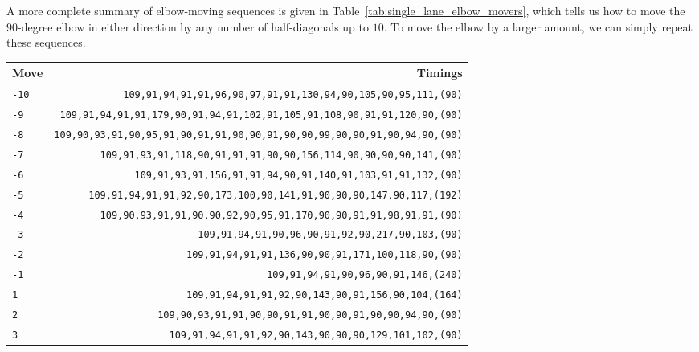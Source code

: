 A more complete summary of elbow-moving sequences is given in Table~\ref{tab:single_lane_elbow_movers}, which tells us how to move the $90$-degree elbow in either direction by any number of half-diagonals up to $10$. To move the elbow by a larger amount, we can simply repeat these sequences.

\begin{table}[!htb]
	\centering
	\begin{tabular}{@{\hskip 0.31cm}L@{\hskip 0.27cm}R@{\hskip 0.34cm}}\toprule
		Move & Timings \\\midrule
		\texttt{-10} & \footnotesize\texttt{109,91,94,91,91,96,90,97,91,91,130,94,90,105,90,95,111,{\color{gray}(90)}}\\
		 \texttt{-9} & \footnotesize\texttt{109,91,94,91,91,179,90,91,94,91,102,91,105,91,108,90,91,91,120,90,{\color{gray}(90)}}\\
		\texttt{-8} & \footnotesize\texttt{109,90,93,91,90,95,91,90,91,91,90,90,91,90,90,99,90,90,91,90,94,90,{\color{gray}(90)}}\\
		 \texttt{-7} & \footnotesize\texttt{109,91,93,91,118,90,91,91,91,90,90,156,114,90,90,90,90,141,{\color{gray}(90)}}\\
		\texttt{-6} & \footnotesize\texttt{109,91,93,91,156,91,91,94,90,91,140,91,103,91,91,132,{\color{gray}(90)}}\\
		 \texttt{-5} & \footnotesize\texttt{109,91,94,91,91,92,90,173,100,90,141,91,90,90,90,147,90,117,{\color{gray}(192)}}\\
		\texttt{-4} & \footnotesize\texttt{109,90,93,91,91,90,90,92,90,95,91,170,90,90,91,91,98,91,91,{\color{gray}(90)}}\\
		 \texttt{-3} & \footnotesize\texttt{109,91,94,91,90,96,90,91,92,90,217,90,103,{\color{gray}(90)}}\\
		\texttt{-2} & \footnotesize\texttt{109,91,94,91,91,136,90,90,91,171,100,118,90,{\color{gray}(90)}}\\
		 \texttt{-1} & \footnotesize\texttt{109,91,94,91,90,96,90,91,146,{\color{gray}(240)}}\\\midrule
		\texttt{1} & \footnotesize\texttt{109,91,94,91,91,92,90,143,90,91,156,90,104,{\color{gray}(164)}}\\
		 \texttt{2} & \footnotesize\texttt{109,90,93,91,91,90,90,91,91,90,90,91,90,90,94,90,{\color{gray}(90)}}\\
		\texttt{3} & \footnotesize\texttt{109,91,94,91,91,92,90,143,90,90,90,129,101,102,{\color{gray}(90)}}\\

\end{tabular}
\end{table}

